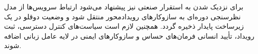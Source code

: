 برای نزدیک شدن به استقرار صنعتی نیز پیشنهاد می‌شود ارتباط سرویس‌ها از مدل نظرسنجی دوره‌ای به سازوکارهای رویدادمحور منتقل شود و وضعیت دوقلو در یک زیرساخت پایدار ذخیره گردد. همچنین لازم است سیاست‌های کنترل دسترسی، ثبت رویداد، تأیید انسانی فرمان‌های حساس و سازوکارهای ایمنی در لایه عامل زبانی اضافه شوند.









